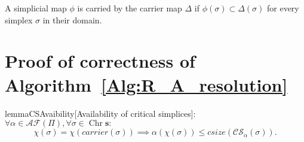 \documentclass[a4paper]{article}
\def\HSS{\mathit{csize}}
\def\s {\mathbf{s}}
\def\Chr{\operatorname{Chr}}
\def\Car{\mathit{carrier}}
\begin{document}
A simplicial map $\phi$ is carried by the carrier
map $\Delta$ if $\phi(\sigma) \subset \Delta(\sigma)$ for every simplex $\sigma$ in their
domain.


\section{Proof of correctness of Algorithm~\ref{Alg:R_A_resolution}}

\label{Appendix:RalphaSimulation}


\begin{restatable}{lemma}{CSAvaibility}{[Availability of critical simplices]:\label{lemma:CSAvaibility}}
$\forall\alpha\in\mathcal{AF}(\Pi),\forall\sigma\in\Chr\s:$
\[\chi(\sigma)=\chi(\Car(\sigma)) \implies 
\alpha(\chi(\sigma))\leq \HSS(\mathcal{CS}_\alpha(\sigma)){}.\]
\end{restatable}
\end{document}
